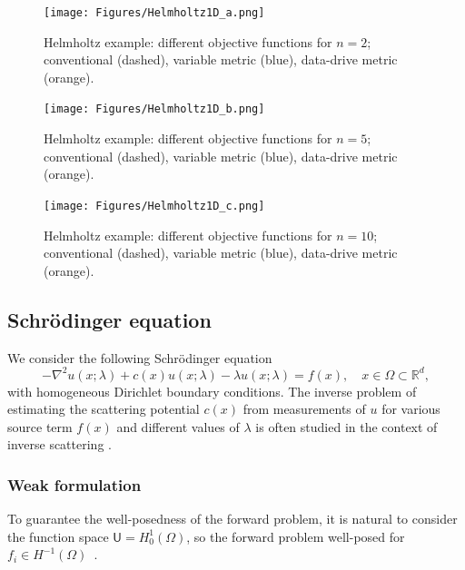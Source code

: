 \documentclass[12pt]{amsart}
\begin{document}
\begin{figure}
\texttt{[image: Figures/Helmholtz1D\_a.png]}
\caption{Helmholtz example: different objective functions for $n=2$; conventional (dashed), variable metric (blue), data-drive metric (orange).}\label{fig:helmholtz1da}
\end{figure}

\begin{figure}
\texttt{[image: Figures/Helmholtz1D\_b.png]}
\caption{Helmholtz example: different objective functions for $n=5$; conventional (dashed), variable metric (blue), data-drive metric (orange).}\label{fig:helmholtz1db}
\end{figure}

\begin{figure}
\texttt{[image: Figures/Helmholtz1D\_c.png]}
\caption{Helmholtz example: different objective functions for $n=10$; conventional (dashed), variable metric (blue), data-drive metric (orange).}\label{fig:helmholtz1dc}
\end{figure}
\subsection{Schr{\"o}dinger equation}
We consider the following Schr{\"o}dinger equation
\begin{equation}\label{eq:sch_eqn}
-\nabla^2 u(x;\lambda) + c(x)u(x;\lambda) - \lambda u(x;\lambda) = f(x), \quad x \in \Omega\subset{\mathbb{R}^d},
\end{equation}
with homogeneous Dirichlet boundary conditions. The inverse problem of estimating the scattering potential $c(x)$ from measurements of $u$ for various source term $f(x)$ and different values of $\lambda$ is often studied in the context of inverse scattering \cite{imanuvilov2012inverse,Novikov2022}.

\subsubsection{Weak formulation}
To guarantee the well-posedness of the forward problem, it is natural to consider the function space $\mathsf{U} = H_0^1(\Omega)$, so the forward problem well-posed for $f_i \in H^{-1}(\Omega)$~\cite{Victor2014}. 
\end{document}

